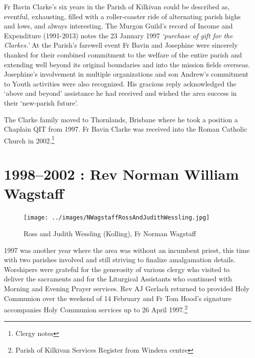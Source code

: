 Fr Bavin Clarke's six years in the Parish of Kilkivan could be described as, eventful, exhausting, filled with a roller-coaster ride of alternating parish highs and lows, and always interesting. The Murgon Guild's record of Income and Expenditure (1991-2013) notes the 23 January 1997 \emph{`purchase of gift for the Clarkes.'} At the Parish's farewell event Fr Bavin and Josephine were sincerely thanked for their combined commitment to the welfare of the entire parish and extending well beyond its original boundaries and into the mission fields overseas. Josephine's involvement in multiple organizations and son Andrew's commitment to Youth activities were also recognized. His gracious reply acknowledged the `above and beyond' assistance he had received and wished the area success in their `new-parish future'.



The Clarke family moved to Thornlands, Brisbane where he took a position a Chaplain QIT from 1997. Fr Bavin Clarke was received into the Roman Catholic Church in 2002.\footnote{Clergy notes}


\section{1998--2002 : Rev Norman William Wagstaff}









\begin{figure}
\begin{center}
\texttt{[image: ../images/NWagstaffRossAndJudithWessling.jpg]}
\caption{Ross and Judith Wessling (Kolling), Fr Norman Wagstaff }
\end{center}
\end{figure}




1997 was another year where the area was without an incumbent priest, this time with two parishes involved and still striving to finalize amalgamation details. Worshipers were grateful for the generosity of various clergy who visited to deliver the sacraments and for the Liturgical Assistants who continued with Morning and Evening Prayer services. Rev AJ Gerlach returned to provided Holy Communion over the weekend of 14 February and Fr Tom Hood's signature accompanies Holy Communion services up to 26 April 1997.\footnote{Parish of Kilkivan Services Register from Windera centre}








